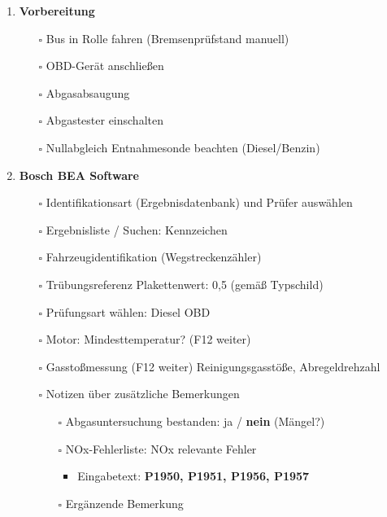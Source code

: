 \documentclass{vorlage-design-main}
\begin{document}
\begin{enumerate}
\def\labelenumi{\arabic{enumi}.}

\item
  \textbf{Vorbereitung}

  \begin{itemize}

  \item[$\square$]
    Bus in Rolle fahren (Bremsenprüfstand manuell)
  \item[$\square$]
    OBD-Gerät anschließen
  \item[$\square$]
    Abgasabsaugung
  \item[$\square$]
    Abgastester einschalten
  \item[$\square$]
    Nullabgleich Entnahmesonde beachten (Diesel/Benzin)
  \end{itemize}
\item
  \textbf{Bosch BEA Software}

  \begin{itemize}

  \item[$\square$]
    Identifikationsart (Ergebnisdatenbank) und Prüfer auswählen
  \item[$\square$]
    Ergebnisliste / Suchen: Kennzeichen
  \item[$\square$]
    Fahrzeugidentifikation (Wegstreckenzähler)
  \item[$\square$]
    Trübungsreferenz Plakettenwert: 0,5 (gemäß Typschild)
  \item[$\square$]
    Prüfungsart wählen: Diesel OBD
  \item[$\square$]
    Motor: Mindesttemperatur? (F12 weiter)
  \item[$\square$]
    Gasstoßmessung (F12 weiter) Reinigungsgasstöße, Abregeldrehzahl
  \item[$\square$]
    Notizen über zusätzliche Bemerkungen

    \begin{itemize}

    \item[$\square$]
      Abgasuntersuchung bestanden: ja / \textbf{nein} (Mängel?)
    \item[$\square$]
      NOx-Fehlerliste: NOx relevante Fehler

      \begin{itemize}

      \item
        Eingabetext: \textbf{P1950, P1951, P1956, P1957}
      \end{itemize}
    \item[$\square$]
      Ergänzende Bemerkung


\end{itemize}
\end{itemize}
\end{enumerate}
\end{document}
